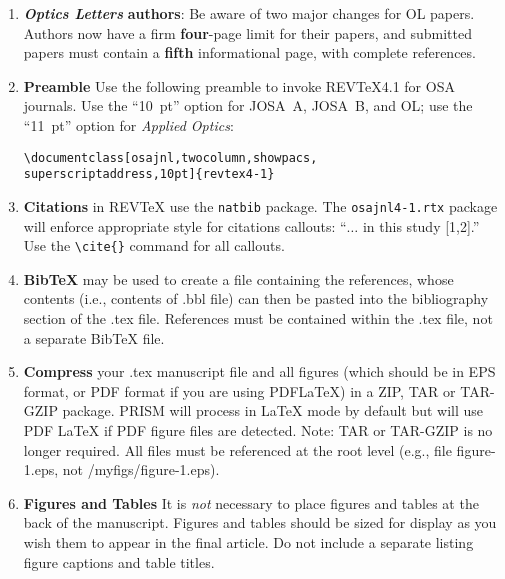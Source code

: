 \documentclass[osajnl,twocolumn,showpacs,superscriptaddress,10pt]{revtex4-1} %
\begin{document}
\begin{enumerate}

\itemsep1em

\item\emph{\textbf{Optics Letters}} \textbf{authors}: Be aware of two major changes for OL papers. Authors now have a firm \textbf{four}-page limit for their papers, and submitted papers must contain a \textbf{fifth} informational page, with complete references.
\item \textbf{Preamble} Use the following preamble to invoke REV\TeX{}4.1 for OSA journals. Use the ``10~pt'' option for JOSA~A, JOSA~B, and OL; use the ``11~pt'' option for \textit{Applied Optics}:

\begin{verbatim}
\documentclass[osajnl,twocolumn,showpacs,
superscriptaddress,10pt]{revtex4-1}
\end{verbatim}

\item \textbf{Citations} in REV\TeX{} use the \texttt{natbib} package. The \texttt{osajnl4-1.rtx} package will enforce appropriate
style for citations callouts: ``$\ldots$ in this study [1,2].''  Use the \verb+\cite{}+ command for all callouts.

\item \textbf{Bib\TeX{}} may be used to create a file containing the references, whose contents
(i.e., contents of .bbl file) can then be pasted into the bibliography section of the .tex file. References must be contained within the .tex file, not a separate Bib\TeX{} file.

\item \textbf{Compress} your .tex manuscript file and all figures (which should be in EPS format, or PDF format if you are using PDFLaTeX) in a ZIP, TAR or TAR-GZIP package. PRISM will process in LaTeX mode by default but will use PDF LaTeX if PDF figure files are detected. Note: TAR or TAR-GZIP is no longer required. All files must be referenced at the root level (e.g., file figure-1.eps, not /myfigs/figure-1.eps).


\item \textbf{Figures and Tables} It is \textit{not} necessary to place figures and tables at the back of the manuscript. Figures and tables should be sized for display as you wish them to appear in the final article. Do not include a separate listing figure captions and table titles.



\end{enumerate}
\end{document}

